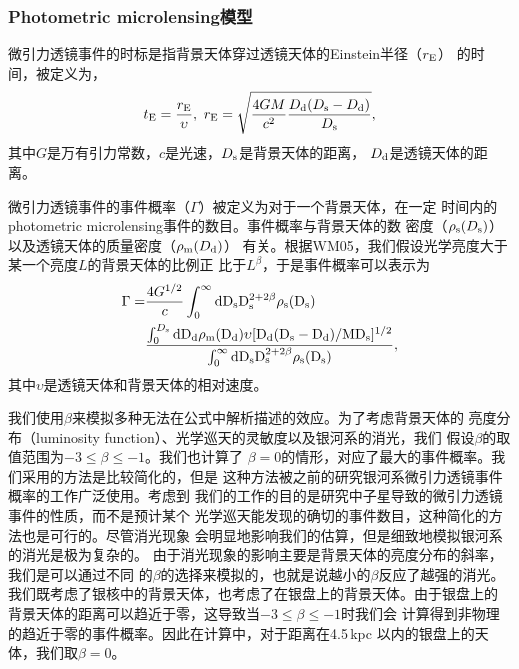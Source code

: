 \subsubsection{Photometric microlensing模型}

微引力透镜事件的时标是指背景天体穿过透镜天体的Einstein半径（$r_{\rm{E}}$）
的时间，被定义为\supercite{Paczynski1996}，
%
\begin{equation}
\label{te}
t_{\rm{E}}=\frac{r_{\rm{E}}}{\upsilon},\
r_{\rm{E}}=\sqrt{\frac{4GM}{c^{2}}\frac{D_{\rm{d}}(D_{\rm{s}}-D_{\rm{d}})}{D_{\rm{s}}}},
\end{equation}
%
其中$G$是万有引力常数，$c$是光速，$D_{\rm{s}}$是背景天体的距离，
$D_{\rm{d}}$是透镜天体的距离。

微引力透镜事件的事件概率（$\Gamma$）被定义为对于一个背景天体，在一定
时间内的photometric microlensing事件的数目。事件概率与背景天体的数
密度（$\rho_{\rm{s}}(D_{\rm{s}})$）以及透镜天体的质量密度（$\rho_{\rm{m}}(D_{\rm{d}})$）
有关。根据WM05，我们假设光学亮度大于某一个亮度$L$的背景天体的比例正
比于$L^{\beta}$，于是事件概率可以表示为
%
\begin{equation}
\label{rate}
\begin{split}
\Gamma=&\frac{4G^{1/2}}{c}\int_{0}^{\infty}\rm{d}D_{\rm{s}}D_{\rm{s}}^{2+2\beta}\rho_{\rm{s}}(D_{\rm{s}})\\
	     &\frac{\int_{0}^{D_{\rm{s}}}\rm{d}D_{\rm{d}}\rho_{\rm{m}}(D_{\rm{d}})\upsilon[D_{\rm{d}}(D_{\rm{s}}-D_{\rm{d}})/MD_{\rm{s}}]^{1/2}}{\int_{0}^{\infty}\rm{d}D_{\rm{s}}D_{\rm{s}}^{2+2\beta}\rho_{\rm{s}}(D_{\rm{s}})},
\end{split}
\end{equation}
%
其中$\upsilon$是透镜天体和背景天体的相对速度。

我们使用$\beta$来模拟多种无法在公式中解析描述的效应。为了考虑背景天体的
亮度分布（luminosity function）、光学巡天的灵敏度以及银河系的消光，我们
假设$\beta$的取值范围为$-3\leq\beta\leq-1$\supercite{kiraga}。我们也计算了
$\beta=0$的情形，对应了最大的事件概率。我们采用的方法是比较简化的，但是
这种方法被之前的研究银河系微引力透镜事件概率的工作广泛使用。考虑到
我们的工作的目的是研究中子星导致的微引力透镜事件的性质，而不是预计某个
光学巡天能发现的确切的事件数目，这种简化的方法也是可行的。尽管消光现象
会明显地影响我们的估算，但是细致地模拟银河系的消光是极为复杂的\supercite{kerins}。
由于消光现象的影响主要是背景天体的亮度分布的斜率，我们是可以通过不同
的$\beta$的选择来模拟的，也就是说越小的$\beta$反应了越强的消光。
我们既考虑了银核中的背景天体，也考虑了在银盘上的背景天体。由于银盘上的
背景天体的距离可以趋近于零，这导致当$-3\leq\beta\leq-1$时我们会
计算得到非物理的趋近于零的事件概率。因此在计算中，对于距离在4.5\,kpc
以内的银盘上的天体，我们取$\beta=0$。

